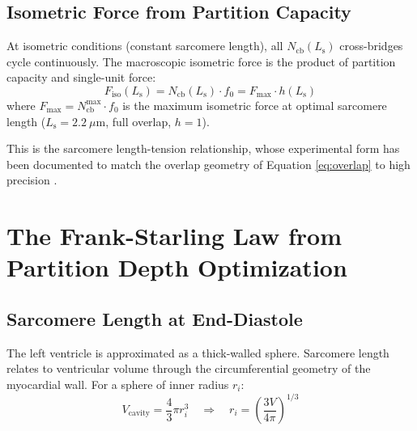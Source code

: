 \documentclass[10pt,twocolumn,a4paper]{article}
\theoremstyle{remark}
\newcommand{\Ncb}{N_{\mathrm{cb}}}
\newcommand{\Ls}{L_{\mathrm{s}}}
\begin{document}
\subsection{Isometric Force from Partition Capacity}

At isometric conditions (constant sarcomere length), all $\Ncb(\Ls)$ cross-bridges cycle continuously. The macroscopic isometric force is the product of partition capacity and single-unit force:
\begin{equation}
    F_{\mathrm{iso}}(\Ls) = \Ncb(\Ls) \cdot f_0 = F_{\max} \cdot h(\Ls)
    \label{eq:force_iso}
\end{equation}
where $F_{\max} = \Ncb^{\max} \cdot f_0$ is the maximum isometric force at optimal sarcomere length ($\Ls = 2.2~\mu\mathrm{m}$, full overlap, $h = 1$).

This is the sarcomere length-tension relationship, whose experimental form has been documented to match the overlap geometry of Equation \ref{eq:overlap} to high precision \cite{gordon1966tension}.

\section{The Frank-Starling Law from Partition Depth Optimization}
\label{sec:frank-starling}

\subsection{Sarcomere Length at End-Diastole}

The left ventricle is approximated as a thick-walled sphere. Sarcomere length relates to ventricular volume through the circumferential geometry of the myocardial wall. For a sphere of inner radius $r_i$:
\begin{equation}
    V_{\mathrm{cavity}} = \frac{4}{3}\pi r_i^3 \quad\Rightarrow\quad r_i = \left(\frac{3V}{4\pi}\right)^{1/3}
\end{equation}
\end{document}

